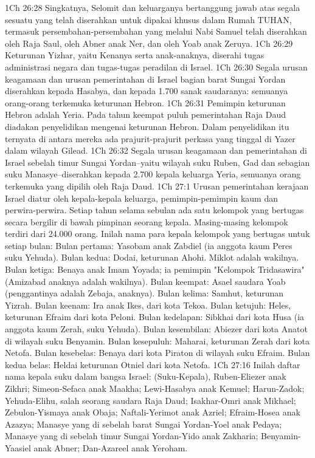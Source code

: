 1Ch 26:28  Singkatnya, Selomit dan keluarganya bertanggung jawab atas segala sesuatu yang telah diserahkan untuk dipakai khusus dalam Rumah TUHAN, termasuk persembahan-persembahan yang melalui Nabi Samuel telah diserahkan oleh Raja Saul, oleh Abner anak Ner, dan oleh Yoab anak Zeruya.
1Ch 26:29  Keturunan Yizhar, yaitu Kenanya serta anak-anaknya, diserahi tugas administrasi negara dan tugas-tugas peradilan di Israel.
1Ch 26:30  Segala urusan keagamaan dan urusan pemerintahan di Israel bagian barat Sungai Yordan diserahkan kepada Hasabya, dan kepada 1.700 sanak saudaranya: semuanya orang-orang terkemuka keturunan Hebron.
1Ch 26:31  Pemimpin keturunan Hebron adalah Yeria. Pada tahun keempat puluh pemerintahan Raja Daud diadakan penyelidikan mengenai keturunan Hebron. Dalam penyelidikan itu ternyata di antara mereka ada prajurit-prajurit perkasa yang tinggal di Yazer dalam wilayah Gilead.
1Ch 26:32  Segala urusan keagamaan dan pemerintahan di Israel sebelah timur Sungai Yordan--yaitu wilayah suku Ruben, Gad dan sebagian suku Manasye--diserahkan kepada 2.700 kepala keluarga Yeria, semuanya orang terkemuka yang dipilih oleh Raja Daud.
1Ch 27:1  Urusan pemerintahan kerajaan Israel diatur oleh kepala-kepala keluarga, pemimpin-pemimpin kaum dan perwira-perwira. Setiap tahun selama sebulan ada satu kelompok yang bertugas secara bergilir di bawah pimpinan seorang kepala. Masing-masing kelompok terdiri dari 24.000 orang. Inilah nama para kepala kelompok yang bertugas untuk setiap bulan: Bulan pertama: Yasobam anak Zabdiel (ia anggota kaum Peres suku Yehuda). Bulan kedua: Dodai, keturunan Ahohi. Miklot adalah wakilnya. Bulan ketiga: Benaya anak Imam Yoyada; ia pemimpin "Kelompok Tridasawira" (Amizabad anaknya adalah wakilnya). Bulan keempat: Asael saudara Yoab (penggantinya adalah Zebaja, anaknya). Bulan kelima: Samhut, keturunan Yizrah. Bulan keenam: Ira anak Ikes, dari kota Tekoa. Bulan ketujuh: Heles, keturunan Efraim dari kota Peloni. Bulan kedelapan: Sibkhai dari kota Husa (ia anggota kaum Zerah, suku Yehuda). Bulan kesembilan: Abiezer dari kota Anatot di wilayah suku Benyamin. Bulan kesepuluh: Maharai, keturunan Zerah dari kota Netofa. Bulan kesebelas: Benaya dari kota Piraton di wilayah suku Efraim. Bulan kedua belas: Heldai keturunan Otniel dari kota Netofa.
1Ch 27:16  Inilah daftar nama kepala suku dalam bangsa Israel: (Suku-Kepala), Ruben-Eliezer anak Zikhri; Simeon-Sefaca anak Maakha; Lewi-Hasabya anak Kemuel; Harun-Zadok; Yehuda-Elihu, salah seorang saudara Raja Daud; Isakhar-Omri anak Mikhael; Zebulon-Yismaya anak Obaja; Naftali-Yerimot anak Azriel; Efraim-Hosea anak Azazya; Manasye yang di sebelah barat Sungai Yordan-Yoel anak Pedaya; Manasye yang di sebelah timur Sungai Yordan-Yido anak Zakharia; Benyamin-Yaasiel anak Abner; Dan-Azareel anak Yeroham.

